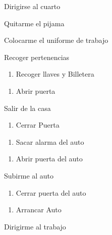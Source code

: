 \item
  Dirigirse al cuarto
\item
  Quitarme el pijama
\item
  Colocarme el uniforme de trabajo
\item
  Recoger pertenencias
\item
  \begin{enumerate}
  \def\labelenumii{\arabic{enumii}.}
  \tightlist
  \item
    Recoger llaves y Billetera
  \end{enumerate}
\item
  \begin{enumerate}
  \def\labelenumii{\arabic{enumii}.}
  \setcounter{enumii}{1}
  \tightlist
  \item
    Abrir puerta
  \end{enumerate}
\item
  Salir de la casa
\item
  \begin{enumerate}
  \def\labelenumii{\arabic{enumii}.}
  \tightlist
  \item
    Cerrar Puerta
  \end{enumerate}
\item
  \begin{enumerate}
  \def\labelenumii{\arabic{enumii}.}
  \setcounter{enumii}{1}
  \tightlist
  \item
    Sacar alarma del auto
  \end{enumerate}
\item
  \begin{enumerate}
  \def\labelenumii{\arabic{enumii}.}
  \setcounter{enumii}{2}
  \tightlist
  \item
    Abrir puerta del auto
  \end{enumerate}
\item
  Subirme al auto
\item
  \begin{enumerate}
  \def\labelenumii{\arabic{enumii}.}
  \tightlist
  \item
    Cerrar puerta del auto
  \end{enumerate}
\item
  \begin{enumerate}
  \def\labelenumii{\arabic{enumii}.}
  \setcounter{enumii}{1}
  \tightlist
  \item
    Arrancar Auto
  \end{enumerate}
\item
  Dirigirme al trabajo
\item
